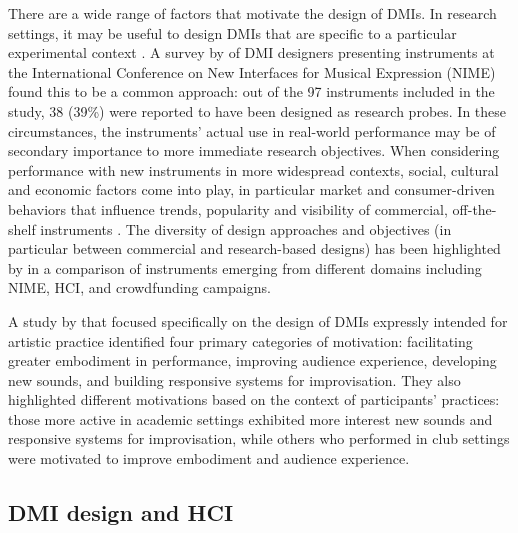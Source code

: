 \documentclass[letterpaper, 12pt]{article}
\begin{document}
There are a wide range of factors that motivate the design of DMIs. In research settings, it may be useful to design DMIs that are specific to a particular experimental context \citep{Marquez-borbon2011}. A survey by \citet{Morreale2017} of DMI designers presenting instruments at the International Conference on New Interfaces for Musical Expression (NIME) found this to be a common approach: out of the 97 instruments included in the study, 38 (39\%) were reported to have been designed as research probes. In these circumstances, the instruments' actual use in real-world performance may be of secondary importance to more immediate research objectives. When considering performance with new instruments in more widespread contexts, social, cultural and economic factors come into play, in particular market and consumer-driven behaviors that influence trends, popularity and visibility of commercial, off-the-shelf instruments \citep{Theberge1997}. The diversity of design approaches and objectives (in particular between commercial and research-based designs) has been highlighted by \citet{mcpherson2019musical} in a comparison of instruments emerging from different domains including NIME, HCI, and crowdfunding campaigns. 

A study by \citet{Emerson2018} that focused specifically on the design of DMIs expressly intended for artistic practice identified four primary categories of motivation: facilitating greater embodiment in performance, improving audience experience, developing new sounds, and building responsive systems for improvisation. They also highlighted different motivations based on the context of participants' practices: those more active in academic settings exhibited more interest new sounds and responsive systems for improvisation, while others who performed in club settings were motivated to improve embodiment and audience experience.

\subsection{DMI design and HCI}
\label{ch3-sec:dmi-design-and-hci}
\end{document}
